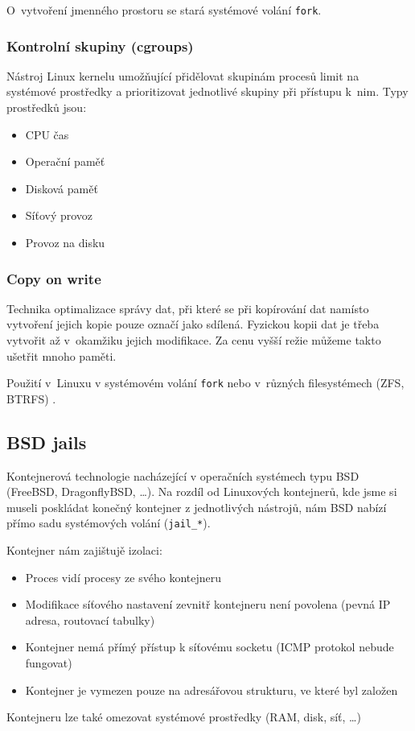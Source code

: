 
O~vytvoření jmenného prostoru se stará systémové volání \verb|fork|.

\subsubsection{Kontrolní skupiny (cgroups)}

Nástroj Linux kernelu umožňující přidělovat skupinám procesů limit na systémové prostředky a prioritizovat jednotlivé skupiny při přístupu k~nim.
Typy prostředků jsou:
\begin{itemize}
	\item CPU čas
	\item Operační paměť
	\item Disková paměť
	\item Síťový provoz
	\item Provoz na disku
\end{itemize}

\subsubsection{Copy on write}

Technika optimalizace správy dat, při které se při kopírování dat namísto vytvoření jejich kopie pouze označí jako sdílená.
Fyzickou kopii dat je třeba vytvořit až v~okamžiku jejich modifikace.
Za cenu vyšší režie můžeme takto ušetřit mnoho paměti.
\cite{copy_on_write}

Použití v~Linuxu v systémovém volání \verb|fork| \cite{fork_manual} nebo v~různých filesystémech (ZFS, BTRFS) \cite{fs_cow}.

\subsection{BSD jails}

Kontejnerová technologie nacházející v operačních systémech typu BSD (FreeBSD, DragonflyBSD, \ldots).
Na rozdíl od Linuxových kontejnerů, kde jsme si museli poskládat konečný kontejner z jednotlivých nástrojů, nám BSD nabízí přímo sadu systémových volání (\verb|jail_*|).

Kontejner nám zajištujě izolaci:
\begin{itemize}
	\item Proces vidí procesy ze svého kontejneru
	\item Modifikace síťového nastavení zevnitř kontejneru není povolena (pevná IP adresa, routovací tabulky)
	\item Kontejner nemá přímý přístup k síťovému socketu (ICMP protokol nebude fungovat)
	\item Kontejner je vymezen pouze na adresářovou strukturu, ve které byl založen
\end{itemize}

Kontejneru lze také omezovat systémové prostředky (RAM, disk, síť, \ldots)


